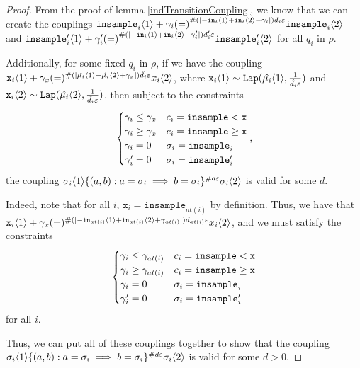 \begin{proof}
    From the proof of lemma \ref{indTransitionCoupling}, we know that we can create the couplings $\texttt{insample}_i\brangle{1} +\gamma_i{(=)}^{\#(|-\texttt{in}_i\brangle{1}+\texttt{in}_i\brangle{2}-\gamma_i|)d_i\varepsilon}\texttt{insample}_i\brangle{2}$ and $\texttt{insample}_i'\brangle{1} +\gamma_i'{(=)}^{\#(|-\texttt{in}_i\brangle{1}+\texttt{in}_i\brangle{2}-\gamma_i'|)d_i'\varepsilon}\texttt{insample}_i'\brangle{2}$ for all $q_i$ in $\rho$. 

    Additionally, for some fixed $q_i$ in $\rho$, if we have the coupling $\texttt{x}_i\brangle{1}+\gamma_x (=)^{\#(|\hat{\mu_i}\brangle{1}-\hat{\mu_i}\brangle{2}+\gamma_x|)\hat{d_i}\varepsilon}x_i\brangle{2}$, where $\texttt{x}_i\brangle{1}\sim \Lap(\hat{\mu_i}\brangle{1}, \frac{1}{\hat{d_i}\varepsilon})$ and $\texttt{x}_i\brangle{2}\sim \Lap(\hat{\mu_i}\brangle{2}, \frac{1}{\hat{d_i}\varepsilon})$, then subject to the constraints \[
        \begin{cases}
          \gamma_i\leq\gamma_x & c_i = \lguard[\texttt{x}]\\
          \gamma_i\geq\gamma_x & c_i = \gguard[\texttt{x}]\\
          \gamma_i=0 & \sigma_i = \texttt{insample}_i\\
          \gamma_i'=0 & \sigma_i = \texttt{insample}_i'
        \end{cases},
      \]
    the coupling $\sigma_i\brangle{1}\{(a, b): a=\sigma_i\implies b=\sigma_i\}^{\#d\varepsilon}\sigma_i\brangle{2}$ is valid for some $d$. 

    Indeed, note that for all $i$, $\texttt{x}_i = \texttt{insample}_{at(i)}$ by definition. Thus, we have that $\texttt{x}_i\brangle{1}+\gamma_x (=)^{\#(|-\texttt{in}_{at(i)}\brangle{1}+\texttt{in}_{at(i)}\brangle{2}+\gamma_{at(i)}|)d_{at(i)}\varepsilon}x_i\brangle{2}$, and we must satisfy the constraints \[
        \begin{cases}
          \gamma_i\leq\gamma_{at(i)} & c_i = \lguard[\texttt{x}]\\
          \gamma_i\geq\gamma_{at(i)} & c_i = \gguard[\texttt{x}]\\
          \gamma_i=0 & \sigma_i = \texttt{insample}_i\\
          \gamma_i'=0 & \sigma_i = \texttt{insample}_i'
        \end{cases}
      \]
      for all $i$.

    Thus, we can put all of these couplings together to show that the coupling $\sigma_i\brangle{1}\{(a, b): a=\sigma_i\implies b=\sigma_i\}^{\#d\varepsilon}\sigma_i\brangle{2}$ is valid for some $d>0$.


\end{proof}
